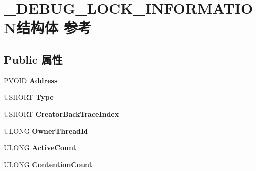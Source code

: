 \hypertarget{struct___d_e_b_u_g___l_o_c_k___i_n_f_o_r_m_a_t_i_o_n}{}\section{\+\_\+\+D\+E\+B\+U\+G\+\_\+\+L\+O\+C\+K\+\_\+\+I\+N\+F\+O\+R\+M\+A\+T\+I\+O\+N结构体 参考}
\label{struct___d_e_b_u_g___l_o_c_k___i_n_f_o_r_m_a_t_i_o_n}
\subsection*{Public 属性}
\begin{DoxyCompactItemize}
\item 
\mbox{\label{struct___d_e_b_u_g___l_o_c_k___i_n_f_o_r_m_a_t_i_o_n_ae6469015fbd0a88168a9b4d9ec8aeb09}} 
\hyperlink{interfacevoid}{P\+V\+O\+ID} {\bfseries Address}
\item 
\mbox{\label{struct___d_e_b_u_g___l_o_c_k___i_n_f_o_r_m_a_t_i_o_n_a8a18ebe93e3f8514098bbcf10f0e1df3}} 
U\+S\+H\+O\+RT {\bfseries Type}
\item 
\mbox{\label{struct___d_e_b_u_g___l_o_c_k___i_n_f_o_r_m_a_t_i_o_n_ab9931fb1d99b74b423e3b528c9c2c5f7}} 
U\+S\+H\+O\+RT {\bfseries Creator\+Back\+Trace\+Index}
\item 
\mbox{\label{struct___d_e_b_u_g___l_o_c_k___i_n_f_o_r_m_a_t_i_o_n_a780b96cc6cfb6a6281669004cf5d30b6}} 
U\+L\+O\+NG {\bfseries Owner\+Thread\+Id}
\item 
\mbox{\label{struct___d_e_b_u_g___l_o_c_k___i_n_f_o_r_m_a_t_i_o_n_a944a787f3f7cdb895d2321aac880516f}} 
U\+L\+O\+NG {\bfseries Active\+Count}
\item 
\mbox{\label{struct___d_e_b_u_g___l_o_c_k___i_n_f_o_r_m_a_t_i_o_n_a9f5f95cc02c6e508518faddc75b827ad}} 
U\+L\+O\+NG {\bfseries Contention\+Count}
\item 

\end{DoxyCompactItemize}
